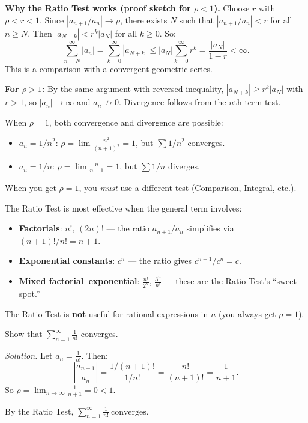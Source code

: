 \noindent
\textbf{Why the Ratio Test works (proof sketch for $\rho<1$).}
Choose $r$ with $\rho<r<1$. Since $|a_{n+1}/a_n|\to \rho$, there exists $N$ such that $|a_{n+1}/a_n|<r$ for all $n\ge N$.
Then $|a_{N+k}|<r^k|a_N|$ for all $k\ge 0$. So:
\[
\sum_{n=N}^{\infty}|a_n|=\sum_{k=0}^{\infty}|a_{N+k}|\le |a_N|\sum_{k=0}^{\infty}r^k=\frac{|a_N|}{1-r}<\infty.
\]
This is a comparison with a convergent geometric series.

\textbf{For $\rho>1$:} By the same argument with reversed inequality, $|a_{N+k}|\ge r^k|a_N|$ with $r>1$, so $|a_n|\to\infty$ and $a_n\not\to 0$. Divergence follows from the $n$th-term test.

\begin{commonmistake}[title={Common Mistake: $\rho=1$ does NOT mean divergence}]
When $\rho=1$, both convergence and divergence are possible:
\begin{itemize}[leftmargin=*]
\item $a_n=1/n^2$: $\rho=\lim\frac{n^2}{(n+1)^2}=1$, but $\sum 1/n^2$ converges.
\item $a_n=1/n$: $\rho=\lim\frac{n}{n+1}=1$, but $\sum 1/n$ diverges.
\end{itemize}
When you get $\rho=1$, you \emph{must} use a different test (Comparison, Integral, etc.).
\end{commonmistake}

\begin{examtip}[title={Exam Focus: When to use the Ratio Test}]
The Ratio Test is most effective when the general term involves:
\begin{itemize}[leftmargin=*]
\item \textbf{Factorials}: $n!$, $(2n)!$ --- the ratio $a_{n+1}/a_n$ simplifies via $(n+1)!/n!=n+1$.
\item \textbf{Exponential constants}: $c^n$ --- the ratio gives $c^{n+1}/c^n=c$.
\item \textbf{Mixed factorial--exponential}: $\frac{n!}{2^n}$, $\frac{3^n}{n!}$ --- these are the Ratio Test's ``sweet spot.''
\end{itemize}
The Ratio Test is \textbf{not} useful for rational expressions in $n$ (you always get $\rho=1$).
\end{examtip}

\begin{examplebox}[title={Worked Example (Lecture Example 5.15): $\sum 1/n!$ converges}]
Show that $\displaystyle\sum_{n=1}^{\infty}\frac{1}{n!}$ converges.

\emph{Solution.}
Let $a_n=\frac{1}{n!}$. Then:
\[
\left|\frac{a_{n+1}}{a_n}\right|=\frac{1/(n+1)!}{1/n!}=\frac{n!}{(n+1)!}=\frac{1}{n+1}.
\]
So $\rho=\lim_{n\to\infty}\frac{1}{n+1}=0<1$.

By the Ratio Test, $\displaystyle\boxed{\sum_{n=1}^{\infty}\frac{1}{n!}\ \text{converges}}$.
\end{examplebox}

